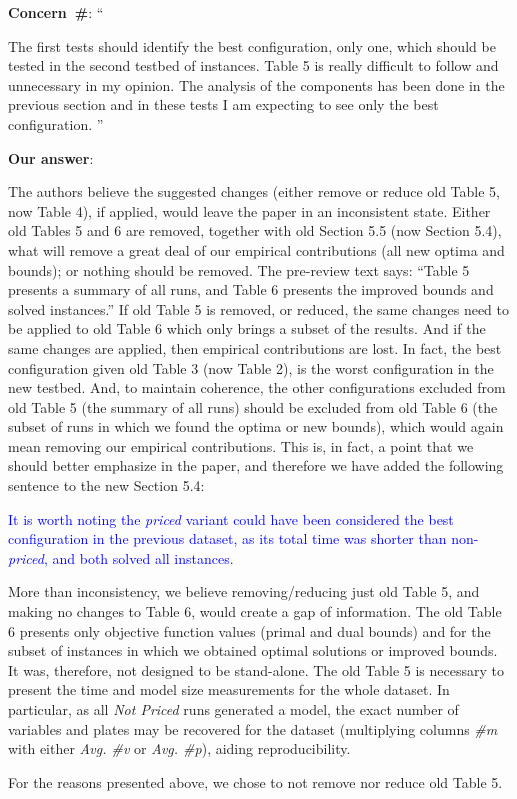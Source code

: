 \documentclass[smallextended]{svjour3}       %
\makeatletter
\newif\iffinalversion
\newcommand{\newtext}[1]{\iffinalversion%
#1%
\else%
\textcolor{blue}{#1}%
\fi%
}
\newcommand\gobblepars{%
    \@ifnextchar\par%
        {\expandafter\gobblepars\@gobble}%
        {}}
\newcounter{concern}
\newenvironment{concern}{%
    \refstepcounter{concern}\par\smallskip\noindent%
    \textbf{Concern~\#\theconcern}: ``\itshape\gobblepars}%
    {\unskip''\smallskip}
\newcounter{answer}
\newenvironment{answer}{%
    \refstepcounter{answer}\par\smallskip\noindent%
    \textbf{Our answer}: \gobblepars}%
    {\unskip\bigskip}
\makeatother
\begin{document}
\begin{concern}
The first tests should identify the best configuration, only one, which should be tested in the second testbed of instances. Table 5 is really difficult to follow and unnecessary in my opinion. The analysis of the components has been done in the previous section and in these tests I am expecting to see only the best configuration.
\end{concern}
\begin{answer}
The authors believe the suggested changes (either remove or reduce old Table 5, now Table 4), if applied, would leave the paper in an inconsistent state. Either old Tables 5 and 6 are removed, together with old Section 5.5 (now Section 5.4), what will remove a great deal of our empirical contributions (all new optima and bounds); or nothing should be removed. The pre-review text says: ``Table 5 presents a summary of all runs, and Table 6 presents the improved bounds and solved instances.'' If old Table 5 is removed, or reduced, the same changes need to be applied to old Table 6 which only brings a subset of the results. And if the same changes are applied, then empirical contributions are lost. In fact, the best configuration given old Table 3 (now Table 2), is the worst configuration in the new testbed. And, to maintain coherence, the other configurations excluded from old Table 5 (the summary of all runs) should be excluded from old Table 6 (the subset of runs in which we found the optima or new bounds), which would again mean removing our empirical contributions. This is, in fact, a point that we should better emphasize in the paper, and therefore we have added the following sentence to the new Section 5.4:

\newtext{It is worth noting the \emph{priced} variant could have been considered the best configuration in the previous dataset, as its total time was shorter than non-\emph{priced}, and both solved all instances.}

More than inconsistency, we believe removing/reducing just old Table 5, and making no changes to Table 6, would create a gap of information. The old Table 6 presents only objective function values (primal and dual bounds) and for the subset of instances in which we obtained optimal solutions or improved bounds. It was, therefore, not designed to be stand-alone. The old Table 5 is necessary to present the time and model size measurements for the whole dataset. In particular, as all \emph{Not Priced} runs generated a model, the exact number of variables and plates may be recovered for the dataset (multiplying columns \emph{\#m} with either \emph{Avg. \#v} or \emph{Avg. \#p}), aiding reproducibility.

For the reasons presented above, we chose to not remove nor reduce old Table 5.
\end{answer}
\end{document}
